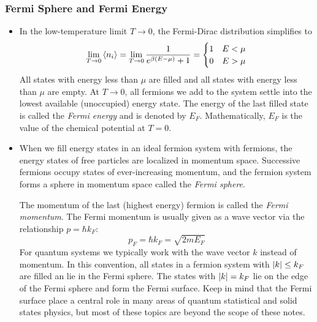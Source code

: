 \documentclass[11pt, a4paper]{article}
\begin{document}
\subsubsection{Fermi Sphere and Fermi Energy}
\begin{itemize}
	\item In the low-temperature limit $ T \to 0 $, the Fermi-Dirac distribution simplifies to
	\begin{equation*}
		\lim_{T \to 0} \expval{n_{i}} = \lim_{T \to 0} \frac{1}{e^{\beta(E - \mu)} + 1} = 
		\begin{cases}
			1 & E < \mu\\
			0 & E > \mu
		\end{cases}
	\end{equation*}
	All states with energy less than $ \mu $ are filled and all states with energy less than $ \mu $ are empty. At $ T \to 0 $, all fermions we add to the system settle into the lowest available (unoccupied) energy state. The energy of the last filled state is called the \textit{Fermi energy} and is denoted by $ E_{F} $. Mathematically, $ E_{F} $ is the value of the chemical potential at $ T = 0 $. 
	
	\item When we fill energy states in an ideal fermion system with fermions, the energy states of free particles are localized in momentum space. Successive fermions occupy states of ever-increasing momentum, and the fermion system forms a sphere in momentum space called the \textit{Fermi sphere}. 
	
	The momentum of the last (highest energy) fermion is called the \textit{Fermi momentum}. The Fermi momentum is usually given as a wave vector via the relationship $ p = \hbar k_{F} $:
	\begin{equation*}
		p_{F} = \hbar k_{F} = \sqrt{2mE_{F}}
	\end{equation*}
	For quantum systems we typically work with the wave vector $ k $ instead of momentum. In this convention, all states in a fermion system with $ \abs{k} \leq k_{F} $  are filled an lie in the Fermi sphere. The states with $ \abs{k} = k_{F} $ lie on the edge of the Fermi sphere and form the Fermi surface. Keep in mind that the Fermi surface place a central role in many areas of quantum statistical and solid states physics, but most of these topics are beyond the scope of these notes.
	

\end{itemize}
\end{document}
